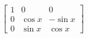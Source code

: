 \documentclass[preview]{standalone}
\begin{document}
\begin{align*}
\begin{bmatrix}1&0&0\\ 0&\cos x&-\sin x\\ 0&\sin x&\cos x\end{bmatrix}
\end{align*}
\end{document}
